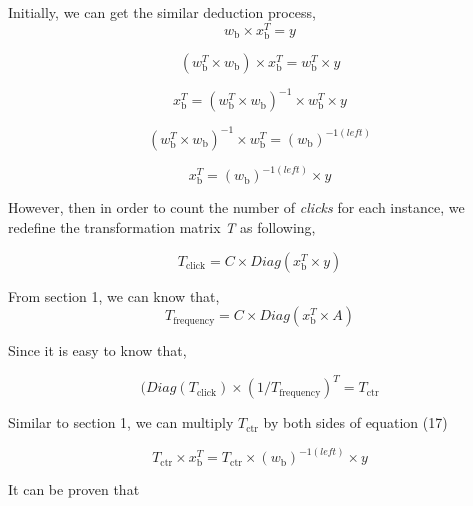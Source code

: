 Initially, we can get the similar deduction process, 
\begin{equation}
w_{\text{b}} \times x_{\text{b}}^T = y 
\end{equation}

\begin{equation}
(w_{\text{b}}^T \times w_{\text{b}}) \times x_{\text{b}}^T = w_{\text{b}}^T \times y 
\end{equation}

\begin{equation}
x_{\text{b}}^T = (w_{\text{b}}^T \times w_{\text{b}})^{-1} \times w_{\text{b}}^T \times y 
\end{equation}

\begin{equation}
(w_{\text{b}}^T \times w_{\text{b}})^{-1} \times w_{\text{b}}^T = (w_{\text{b}})^{-1(left)}  
\end{equation}

\begin{equation}
x_{\text{b}}^T =  (w_{\text{b}})^{-1(left)} \times y 
\end{equation}

However, then in order to count the number of \textsl{clicks} for each instance, we redefine the transformation matrix \textsl{T} as following, 

\begin{equation}
T_{\text{click}} = C \times Diag(x_{\text{b}}^T \times y)
\end{equation}



From section 1, we can know that, 
\begin{equation}
T_{\text{frequency}} = C \times Diag(x_{\text{b}}^T \times A)
\end{equation}

Since it is easy to know that,

\begin{equation}
(Diag(T_{\text{click}}) \times (1/T_{\text{frequency}} )^T =  T_{\text{ctr}}
\end{equation}

Similar to section 1, we can multiply \(T_{\text{ctr}}\) by both sides of equation (17)

\begin{equation}
T_{\text{ctr}} \times x_{\text{b}}^T =  T_{\text{ctr}} \times (w_{\text{b}})^{-1(left)} \times y 
\end{equation}

It can be proven that 


